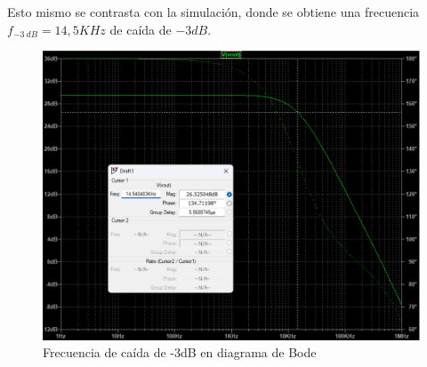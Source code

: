 Esto mismo se contrasta con la simulación, donde se obtiene una frecuencia \(f_{-3~dB}= 14,5KHz\) de caída de \(-3dB\).

\begin{figure}[H]
    \centering
    \includegraphics[width=0.8\linewidth]{img/Bode -3.png}
    \caption{Frecuencia de caída de -3dB en diagrama de Bode}
    
\end{figure}